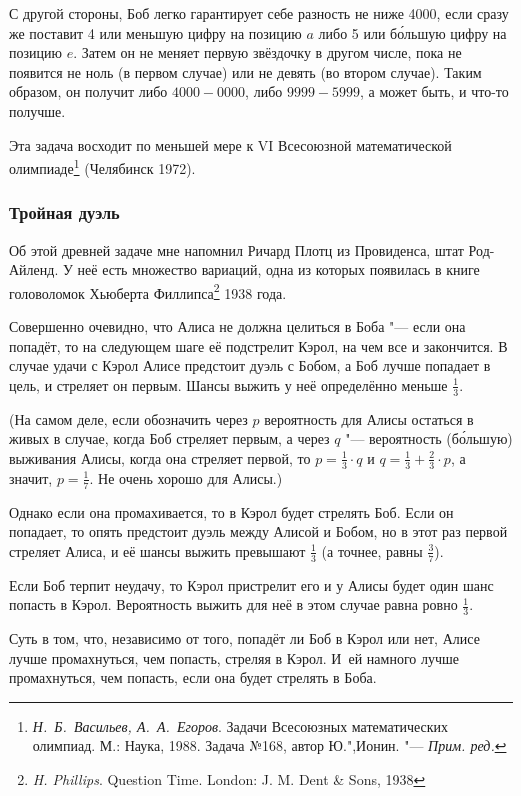 \documentclass[twoside]{book}
\newcommand\VsMO{\emph{Н.~Б.~Васильев, А.~А.~Егоров}. Задачи Всесоюзных математических олимпиад. М.: Наука, 1988}
\begin{document}
С другой стороны, Боб легко гарантирует себе разность не ниже 4000,
если сразу же поставит 4 или меньшую цифру на позицию $a$ либо 5 или
б\'{о}льшую цифру на позицию $e$.
Затем он не меняет первую звёздочку
в другом числе, пока не появится не ноль (в первом случае) или не
девять (во втором случае).
Таким образом, он получит либо
$4000-0000$, либо $9999-5999$, а может быть, и что-то получше. \heart

\medskip
Эта задача восходит по меньшей мере к VI Всесоюзной математической олимпиаде\footnote{\VsMO. Задача №168, автор Ю.",Ионин. "--- \emph{Прим. ред.}} (Челябинск 1972).

\subsubsection*{Тройная дуэль}%

Об этой древней задаче мне напомнил Ричард Плотц из Провиденса, штат
Род-Айленд.
У неё есть множество вариаций, одна из которых появилась
в книге головоломок Хьюберта
Филлипса\footnote{\emph{H. Phillips}. {Question Time}. London: J. M. Dent \& Sons, 1938} 1938 года.

\medskip

Совершенно очевидно, что Алиса не должна целиться в Боба "--- если она
попадёт, то на следующем шаге её подстрелит Кэрол, на чем все и закончится.
В
случае удачи с Кэрол Алисе предстоит дуэль с Бобом, а Боб лучше
попадает в цель, и стреляет он первым.
Шансы выжить у неё определённо
меньше $\tfrac13$.

(На самом деле, если обозначить через $p$ вероятность для Алисы
остаться в живых в случае, когда Боб стреляет первым, а через $q$ "---
вероятность (б\'{о}льшую) выживания Алисы, когда она стреляет первой,
то $p=\tfrac13\cdot q$ и $q=\tfrac13+\tfrac23\cdot p$, а значит,
$p=\tfrac17$.
Не очень хорошо для Алисы.)

Однако если она промахивается, то в Кэрол будет стрелять Боб.
Если он попадает, то опять предстоит дуэль между Алисой и Бобом, но в этот раз первой стреляет Алиса, и её шансы выжить превышают $\tfrac13$ (а точнее, равны $\tfrac37$).

Если Боб терпит неудачу, то Кэрол пристрелит его и у Алисы будет один
шанс попасть в Кэрол.
Вероятность выжить для неё в этом случае равна
ровно $\tfrac13$.

Суть в том, что, независимо от того, попадёт ли Боб в Кэрол или нет,
Алисе лучше промахнуться, чем попасть, стреляя в Кэрол.
И~ей намного лучше промахнуться, чем попасть, если она будет стрелять в Боба.
\end{document}
